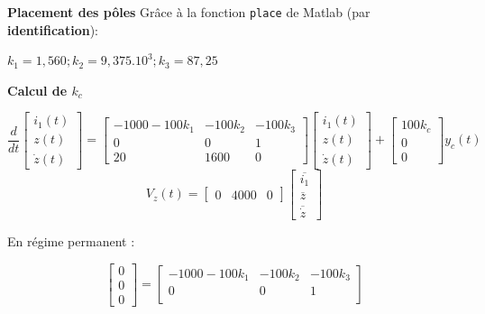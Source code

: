 {{{\textbf{Placement des pôles} \newline
Grâce à la fonction \texttt{place} de Matlab (par \textbf{identification}): 
\begin{center}
    \large{$
    k_{1} = 1,560; k_{2} = 9,375.10^{3}; k_{3} = 87,25
    $}
\end{center}
\newpage
\textbf{Calcul de $k_{c}$}
\begin{center}
    \[
    \frac{d}{dt}
    \begin{bmatrix}
    i_{1}(t) \\
    z(t) \\
    \dot{z}(t)    
    \end{bmatrix}
    =
    \begin{bmatrix}
        -1000-100k_{1} & -100k_{2}  & -100k_{3} \\
        0              & 0          & 1         \\
        20             & 1600       & 0
    \end{bmatrix}
    \begin{bmatrix}
        i_{1}(t) \\
        z(t) \\
        \dot{z}(t)    
    \end{bmatrix}
    +
    \begin{bmatrix}
        100k_{c} \\
        0 \\
        0
    \end{bmatrix}
    y_{c}(t)
    \] \newline
    \[
    V_{z}(t) = 
    \begin{bmatrix}
        0 & 4000 & 0
    \end{bmatrix}
    \begin{bmatrix}
        \overline{i_{1}} \\
        \overline{z} \\
        \overline{\dot{z}}   
    \end{bmatrix}
    \]
\end{center}
En régime permanent :
\begin{center}
    \[
    \begin{bmatrix}
    0 \\
    0 \\
    0    
    \end{bmatrix}
    =
    \begin{bmatrix}
        -1000-100k_{1} & -100k_{2}  & -100k_{3} \\
        0              & 0          & 1         \\

\end{bmatrix}\]
\end{center}}}}
